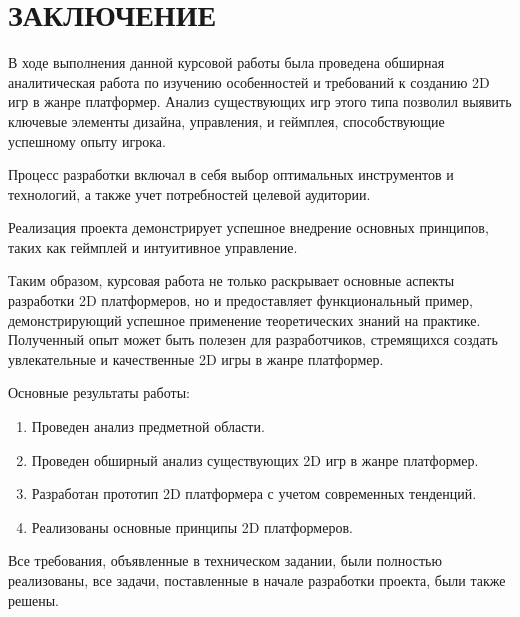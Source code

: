 \section*{ЗАКЛЮЧЕНИЕ}

В ходе выполнения данной курсовой работы была проведена обширная аналитическая работа по изучению особенностей и требований к созданию 2D игр в жанре платформер. Анализ существующих игр этого типа позволил выявить ключевые элементы дизайна, управления, и геймплея, способствующие успешному опыту игрока.

Процесс разработки включал в себя выбор оптимальных инструментов и технологий, а также учет потребностей целевой аудитории.

Реализация проекта демонстрирует успешное внедрение основных принципов, таких как геймплей и интуитивное управление. 

Таким образом, курсовая работа не только раскрывает основные аспекты разработки 2D платформеров, но и предоставляет функциональный пример, демонстрирующий успешное применение теоретических знаний на практике. Полученный опыт может быть полезен для разработчиков, стремящихся создать увлекательные и качественные 2D игры в жанре платформер.

Основные результаты работы:

\begin{enumerate}
\item Проведен анализ предметной области.
\item Проведен обширный анализ существующих 2D игр в жанре платформер.
\item Разработан прототип 2D платформера с учетом современных тенденций.
\item Реализованы основные принципы 2D платформеров.
\end{enumerate}

Все требования, объявленные в техническом задании, были полностью реализованы, все задачи, поставленные в начале разработки проекта, были также решены.